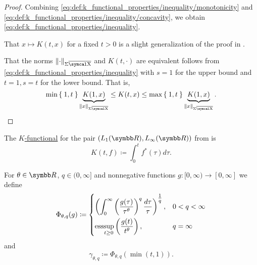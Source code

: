 \begin{proof}
  Combining \eqref{eq:def:k_functional_properties/inequality/monotonicity} and \eqref{eq:def:k_functional_properties/inequality/concavity}, we obtain \eqref{eq:def:k_functional_properties/inequality}.

   That \( x \mapsto K(t, x) \) for a fixed \( t > 0 \) is a slight generalization of the proof in .

  That the norms \( \Norm{\cdot}_{\Sigma \Ol{\CX}} \) and \( K(t, \cdot) \) are equivalent follows from \eqref{eq:def:k_functional_properties/inequality} with \( s = 1 \) for the upper bound and \( t = 1, s = t \) for the lower bound. That is,
  \begin{equation*}
    \min\Set{1, t} \underbrace{K(1, x)}_{\Norm{x}_{\Sigma \Ol{\CX}}} \leq K(t, x) \leq \max\Set{1, t} \underbrace{K(1, x)}_{\Norm{x}_{\Sigma \Ol{\CX}}}.
  \end{equation*}
\end{proof}

\begin{example}\label{thm:lp_interpolation_spaces/k_functional}
  The \hyperref[def:k_functional]{\( K \)-functional} for the pair \( (L_1(\BR), L_\infty(\BR)) \) from  is
  \begin{equation*}
    K(t, f) \coloneqq \int_0^t f^*(\tau) d\tau.
  \end{equation*}
\end{example}

\begin{definition}\label{def:lorenz_quasinorm}
  For \( \theta \in \BR \), \( q \in (0, \infty] \) and nonnegative functions \( g: [0, \infty) \to [0, \infty] \) we define
  \begin{equation}\label{eq:def:lorenz_quasinorm}
    \Phi_{\theta,q}(g) \coloneqq \begin{dcases}
      \left( \int_0^\infty \left( \frac {g(\tau)} {\tau^\theta} \right)^q \frac {d\tau} \tau \right)^{\tfrac 1 q}, &0 < q < \infty \\
      \operatorname{ess}\!\sup_{t \geq 0} \left( \frac {g(t)} {t^\theta} \right),                                                &q = \infty
    \end{dcases}
  \end{equation}
  and
  \begin{equation}\label{eq:def:lorenz_quasinorm/gamma}
    \gamma_{\theta,q} \coloneqq \Phi_{\theta,q}(\min(t, 1)).
  \end{equation}
\end{definition}

